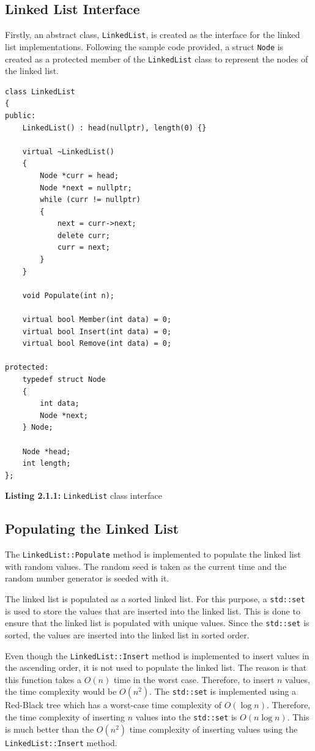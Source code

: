 \documentclass[a4paper,12pt]{article}
\begin{document}
\subsection{Linked List Interface}

Firstly, an abstract class, \lstinline|LinkedList|, is created as the interface for the linked list implementations. Following the sample code provided, a struct \lstinline|Node| is created as a protected member of the \lstinline|LinkedList| class to represent the nodes of the linked list.

\begin{lstlisting}
class LinkedList
{
public:
    LinkedList() : head(nullptr), length(0) {}

    virtual ~LinkedList()
    {
        Node *curr = head;
        Node *next = nullptr;
        while (curr != nullptr)
        {
            next = curr->next;
            delete curr;
            curr = next;
        }
    }

    void Populate(int n);

    virtual bool Member(int data) = 0;
    virtual bool Insert(int data) = 0;
    virtual bool Remove(int data) = 0;

protected:
    typedef struct Node
    {
        int data;
        Node *next;
    } Node;

    Node *head;
    int length;
};
\end{lstlisting}
\begin{center}
    \textbf{Listing 2.1.1:} \lstinline|LinkedList| class interface
\end{center}

\subsection{Populating the Linked List}

The \lstinline|LinkedList::Populate| method is implemented to populate the linked list with random values. The random seed is taken as the current time and the random number generator is seeded with it.

The linked list is populated as a sorted linked list. For this purpose, a \lstinline|std::set| is used to store the values that are inserted into the linked list. This is done to ensure that the linked list is populated with unique values. Since the \lstinline|std::set| is sorted, the values are inserted into the linked list in sorted order.

Even though the \lstinline|LinkedList::Insert| method is implemented to insert values in the ascending order, it is not used to populate the linked list. The reason is that this function takes a \( O(n) \) time in the worst case. Therefore, to insert \( n \) values, the time complexity would be \( O(n^2) \). The \lstinline|std::set| is implemented using a Red-Black tree which has a worst-case time complexity of \( O(\log n) \). Therefore, the time complexity of inserting \( n \) values into the \lstinline|std::set| is \( O(n \log n) \). This is much better than the \( O(n^2) \) time complexity of inserting values using the \lstinline|LinkedList::Insert| method.
\end{document}
